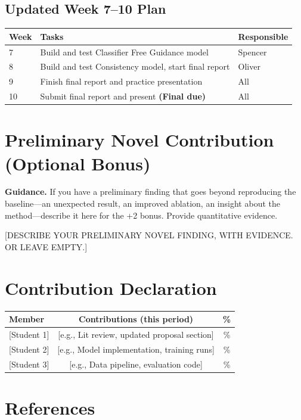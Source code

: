\documentclass[11pt, letterpaper]{article}
\begin{document}
\subsection{Updated Week 7--10 Plan}

\begin{tabular}{lp{8cm}l}
\toprule
\textbf{Week} & \textbf{Tasks} & \textbf{Responsible} \\
\midrule
7 & Build and test Classifier Free Guidance model & Spencer \\
8 & Build and test Consistency model, start final report & Oliver \\
9 & Finish final report and practice presentation & All \\
10 & Submit final report and present \textbf{(Final due)} & All \\
\bottomrule
\end{tabular}

\section{Preliminary Novel Contribution (Optional Bonus)}

\begin{guidancebox}
\textbf{Guidance.} If you have a preliminary finding that goes beyond
reproducing the baseline---an unexpected result, an improved ablation,
an insight about the method---describe it here for the +2 bonus.
Provide quantitative evidence.
\end{guidancebox}

[DESCRIBE YOUR PRELIMINARY NOVEL FINDING, WITH EVIDENCE. OR LEAVE EMPTY.]

\section{Contribution Declaration}

\begin{tabular}{lcc}
\toprule
\textbf{Member} & \textbf{Contributions (this period)} & \textbf{\%} \\
\midrule
{[Student 1]} & [e.g., Lit review, updated proposal section] & \% \\
{[Student 2]} & [e.g., Model implementation, training runs] & \% \\
{[Student 3] }& [e.g., Data pipeline, evaluation code] & \% \\
\bottomrule
\end{tabular}

\section{References}

\begin{enumerate}[label={[\arabic*]},leftmargin=*]
  \item [Author(s), Year. ``Title.'' \textit{Venue}. arXiv:XXXX.XXXXX]
  \item [\ldots]
\end{enumerate}
\end{document}
